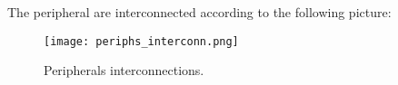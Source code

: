 




The peripheral are interconnected according to the following picture:

\begin{figure}[!htbp]
    \centerline{\texttt{[image: periphs\_interconn.png]}}
    \vspace{0cm}\caption{Peripherals interconnections.}
    \label{fig:periphs}
\end{figure}
